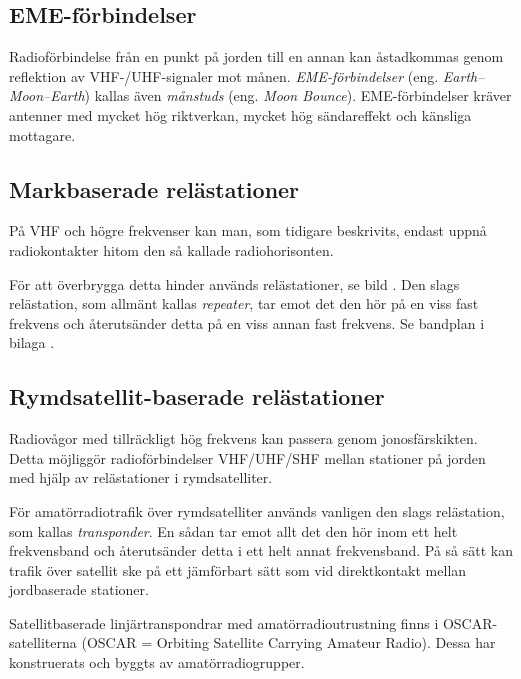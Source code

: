 \subsection{EME-förbindelser}

Radioförbindelse från en punkt på jorden till en annan kan åstadkommas
genom reflektion av VHF-/UHF-signaler mot månen.
\emph{EME-förbindelser} (eng. \emph{Earth--Moon--Earth}) kallas även
\emph{månstuds} (eng. \emph{Moon Bou\-n\-ce}).
EME-förbindelser kräver antenner med mycket hög riktverkan, mycket hög
sändareffekt och känsliga mottagare.

\subsection{Markbaserade relästationer}


På VHF och högre frekvenser kan man, som tidigare beskrivits, endast
uppnå radiokontakter hitom den så kallade radiohorisonten.

För att överbrygga detta hinder används relästationer, se bild
.
Den slags relästation, som allmänt kallas \emph{repeater}, tar emot det den hör
på en viss fast frekvens och återutsänder detta på en viss annan fast frekvens.
Se bandplan i bilaga .

\subsection{Rymdsatellit-baserade relästationer}

Radiovågor med tillräckligt hög frekvens kan passera genom jonosfärskikten.
Detta möjliggör radioförbindelser VHF/UHF/SHF mellan
stationer på jorden med hjälp av relästationer i rymdsatelliter.

För amatörradiotrafik över rymdsatelliter används vanligen den slags
relästation, som kallas \emph{transponder}.
En sådan tar emot allt det den hör inom ett helt frekvensband och återutsänder
detta i ett helt annat frekvensband.
På så sätt kan trafik över satellit ske på ett jämförbart sätt som vid
direktkontakt mellan jordbaserade stationer.

Satellitbaserade linjärtranspondrar med amatörradioutrustning finns i
OSCAR-satelliterna (OSCAR = Orbiting Satellite Carrying Amateur Radio).
Dessa har konstruerats och byggts av amatörradiogrupper.

